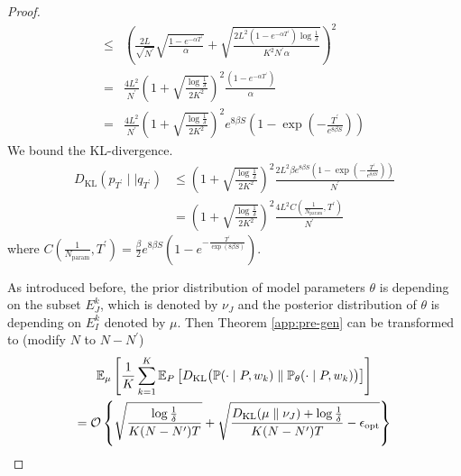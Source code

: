 \begin{proof}
$$\begin{aligned}
		\leq& \left(\frac{2L}{\sqrt{N^\prime}}\sqrt{\frac{1-e^{-\alpha {T^\prime}}}{\alpha}}+\sqrt{\frac{ 2L^2(1-e^{-\alpha {T^\prime}}) \log \frac{1}{\delta}}{K^2N^\prime\alpha}}\right)^2 \\
		=& \frac{4L^2}{N^\prime}\left(1+\sqrt{\frac{\log \frac{1}{\delta}}{2K^2}}\right)^2 \frac{(1-e^{-\alpha {T^\prime}})}{\alpha} \\
		=& \frac{4L^2}{N^\prime}\left(1+\sqrt{\frac{\log \frac{1}{\delta}}{2K^2}}\right)^2 e^{8\beta S}\left(1-\exp\left(-\frac{ {T^\prime}}{e^{8\beta S}}\right)\right)
	\end{aligned}
	$$
	We bound the KL-divergence.
	\begin{align}
		\label{data-dependent-KL}
		D_{\operatorname{KL}}\left(p_{T^\prime}\mid\mid q_{T^\prime}\right)
		&\leq\left(1+\sqrt{\frac{\log \frac{1}{\delta}}{2K^2}}\right)^2 \frac{2L^2\beta e^{8\beta S}(1-\exp(-\frac{ {T^\prime}}{e^{8\beta S}}))}{N^\prime}\\
		&=\left(1+\sqrt{\frac{\log \frac{1}{\delta}}{2K^2}}\right)^2 \frac{4L^2C(\frac{1}{N_{\text{param}}},{T^\prime})}{N^\prime}
	\end{align}
	where $C(\frac{1}{N_{\text{param}}},{T^\prime})=\frac{\beta}{2}e^{8\beta S}\left(1-e^{-\frac{ {T^\prime}}{\exp(8\beta S)}}\right)$.
	
	As introduced before, the prior distribution of model parameters $\theta$ is depending on the subset $E^k_J$, which is denoted by $\nu_J$ and the posterior distribution of $\theta$ is depending on $E^k_I$ denoted by $\mu$. Then Theorem \ref{app:pre-gen} can be transformed to (modify $N$ to $N-N^\prime$)
	\begin{multline}\label{data-depenent-1}
		\mathbb{E}_{\mu}\left[\frac{1}{K}\sum_{k=1}^K\mathbb{E}_{P}\left[D_{\mathrm{KL}}\big(\mathbb{P}(\cdot\mid P,w_k)\parallel \mathbb{P}_{\theta}(\cdot\mid P,w_k)\big)\right]\right] \\
		=\mathcal{O}\left\{\sqrt{\frac{\log \frac{1}{\delta}}{K(N-N^\prime)T}}+\sqrt{\frac{D_{\mathrm{KL}}(\mu\parallel \nu_J)+\operatorname{log}\frac{1}{\delta}}{K(N-N^\prime)T}-\epsilon_{\text{opt}}}\right\}
	\end{multline}
	

\end{proof}
